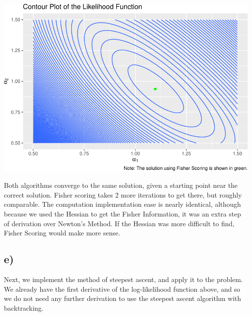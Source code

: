 \documentclass[]{article}
\begin{document}
\includegraphics{Atlas-PS_3_files/figure-latex/unnamed-chunk-4-1.pdf}

Both algorithms converge to the same solution, given a starting point
near the correct solution. Fisher scoring takes 2 more iterations to get
there, but roughly comparable. The computation implementation ease is
nearly identical, although because we used the Hessian to get the Fisher
Information, it was an extra step of derivation over Newton's Method. If
the Hessian was more difficult to find, Fisher Scoring would make more
sense.

\subsection{e)}\label{e}

Next, we implement the method of steepest ascent, and apply it to the
problem. We already have the first derivative of the log-likelihood
function above, and so we do not need any further derivation to use the
steepest ascent algorithm with backtracking.
\end{document}
